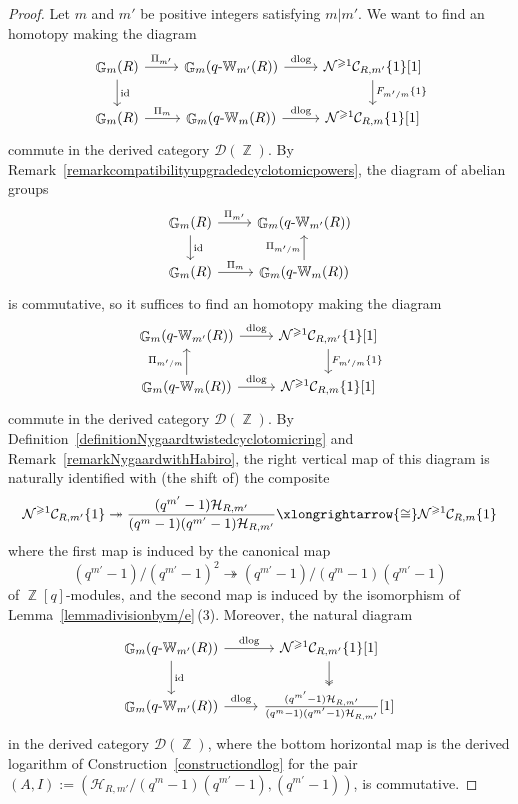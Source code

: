 \documentclass[10pt,twoside]{scrarticle}
\newlength{\mar} \setlength{\mar}{1cm}%
\newlength{\len}
\theoremstyle{definition}
\DeclareMathOperator{\Z}{\mathbb{Z}}
\DeclareMathOperator{\G}{\mathbb{G}}
\newcommand{\CRm}{\mathcal{C}_{R,m}}
\newcommand{\qWm}{q\text{-}\mathbb{W}_m}
\newcommand{\qWmm}{q\text{-}\mathbb{W}_{m'}}
\renewcommand{\ge}{\geqslant}
\newcommand{\dlog}{\mathrm{dlog}}
\numberwithin{equation}{theorem}
\begin{document}
\begin{proof} 
    Let $m$ and $m'$ be positive integers satisfying $m|m'$. We want to find an homotopy making the diagram
    $$\begin{tikzcd}
        \G_m(R) \arrow[d,"\text{id}"] \arrow[r,"\Pi_{m'}"] & \G_m(\qWmm(R)) \ar[r,"\dlog"] & \mathcal{N}^{\ge 1}\mathcal{C}_{R,m'}\{1\}[1] \arrow[d,"F_{m'/m}\{1\}"] \\
        \G_m(R) \arrow[r,"\Pi_m"] & \G_m(\qWm(R)) \ar[r,"\dlog"] & \mathcal{N}^{\ge 1}\mathcal{C}_{R,m}\{1\}[1]
    \end{tikzcd}$$
    commute in the derived category $\mathcal{D}(\Z)$. 
    By Remark~\ref{remarkcompatibilityupgradedcyclotomicpowers}, the diagram of abelian groups
    $$\begin{tikzcd} 
        \G_m(R) \arrow[d,"\text{id}"] \arrow[r,"\Pi_{m'}"] & \G_m(\qWmm(R)) \\
        \G_m(R) \arrow[r,"\Pi_m"] & \G_m(\qWm(R)) \ar[u,"\Pi_{m'/m}"]
    \end{tikzcd}$$
    is commutative, so it suffices to find an homotopy making the diagram
    $$\begin{tikzcd}
        \G_m(\qWmm(R)) \ar[r,"\dlog"] & \mathcal{N}^{\ge 1}\mathcal{C}_{R,m'}\{1\}[1] \arrow[d,"F_{m'/m}\{1\}"] \\
        \G_m(\qWm(R)) \ar[r,"\dlog"] \ar[u,"\Pi_{m'/m}"] & \mathcal{N}^{\ge 1}\CRm\{1\}[1]
    \end{tikzcd}$$
    commute in the derived category $\mathcal{D}(\Z)$. 
    By Definition~\ref{definitionNygaardtwistedcyclotomicring} and Remark~\ref{remarkNygaardwithHabiro}, the right vertical map of this diagram is naturally identified with (the shift of) the composite
    $$\mathcal{N}^{\ge 1} \mathcal{C}_{R,m'}\{1\} \twoheadrightarrow {\frac{(q^{m'}-1)\mathcal{H}_{R,m'}}{(q^{m}-1)(q^{m'}-1)\mathcal{H}_{R,m'}}} \xlongrightarrow{\cong} \mathcal{N}^{\ge 1} \CRm\{1\}$$
    where the first map is induced by the canonical map
    $$(q^{m'}-1)/(q^{m'}-1)^2 \twoheadrightarrow (q^{m'}-1)/(q^m-1)(q^{m'}-1)$$ of $\Z[q]$-modules, and the second map is induced by the isomorphism of Lemma~\ref{lemmadivisionbym/e}\,(3). 
    Moreover, the natural diagram
    $$\begin{tikzcd}
        \G_m(\qWmm(R)) \ar[r,"\dlog"] \ar[d,"\text{id}"] & \mathcal{N}^{\ge 1} \mathcal{C}_{R,m'}\{1\}[1] \arrow[d,two heads] \\
        \G_m(\qWmm(R)) \ar[r,"\dlog"] & {\frac{(q^{m'}-1)\mathcal{H}_{R,m'}}{(q^{m}-1)(q^{m'}-1)\mathcal{H}_{R,m'}}}[1]
    \end{tikzcd}$$
    in the derived category $\mathcal{D}(\Z)$, where the bottom horizontal map is the derived logarithm of Construction~\ref{constructiondlog} for the pair 
    $(A,I) := (\mathcal{H}_{R,m'}/(q^m-1)(q^{m'}-1),(q^{m'}-1))$, 
    is commutative.
    

\end{proof}
\end{document}
